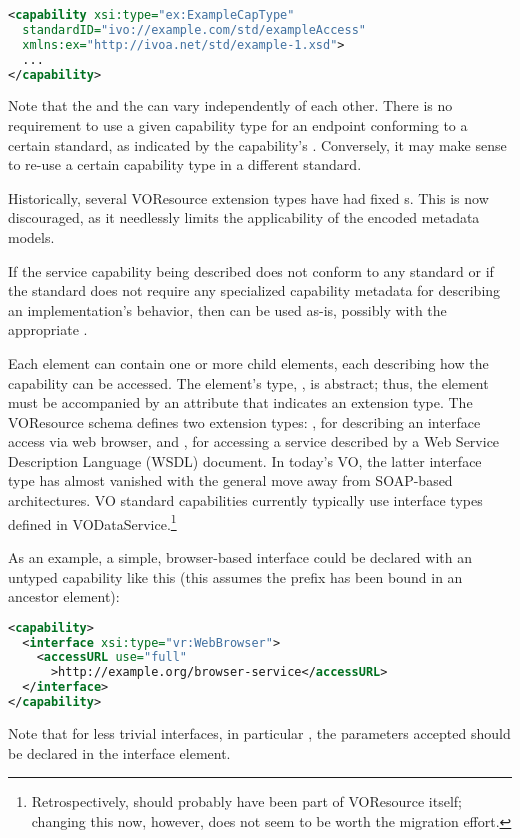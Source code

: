 \documentclass[11pt,a4paper]{ivoa}
\begin{document}
\begin{lstlisting}[language=XML]
<capability xsi:type="ex:ExampleCapType"
  standardID="ivo://example.com/std/exampleAccess"
  xmlns:ex="http://ivoa.net/std/example-1.xsd">
  ...
</capability>
\end{lstlisting}

Note that the  and the  can vary
independently of each other.  There is no requirement to use a given
capability type for an endpoint conforming to a certain standard, as
indicated by the capability's . Conversely,
it may make sense to re-use a certain capability type in a different
standard. 

Historically, several VOResource extension types have had
fixed s.  This is now discouraged, as it needlessly
limits the applicability of the encoded metadata models.

If the service capability being described does not conform to any
standard or if the standard does not require any specialized
capability metadata for describing an implementation's behavior, then
 can be used as-is, possibly with the appropriate
.


Each  element can contain one or more child
 elements, each describing how the capability
can be accessed.  The  element's type,
, is abstract; thus, the
 element must be accompanied by an
 attribute that indicates an
 extension type.  The VOResource schema
defines two  extension types:
, for describing an interface access via web
browser, and , for accessing a service
described by a Web Service Description Language (WSDL) document.  In
today's VO, the latter interface type has almost vanished with the
general move away from SOAP-based architectures.  VO standard
capabilities currently typically use interface types defined in
VODataService.\footnote{Retrospectively,  should probably
have been part of VOResource itself; changing this now, however, does
not seem to be worth the migration effort.}

As an example, a simple, browser-based interface could be declared with
an untyped capability like this (this assumes the  prefix has
been bound in an ancestor element):
\begin{lstlisting}[language=XML]
<capability>
  <interface xsi:type="vr:WebBrowser">
    <accessURL use="full"
      >http://example.org/browser-service</accessURL>
  </interface>
</capability>
\end{lstlisting}
Note that for less trivial interfaces, in particular
, the parameters accepted should be declared in the
interface element.
\end{document}

